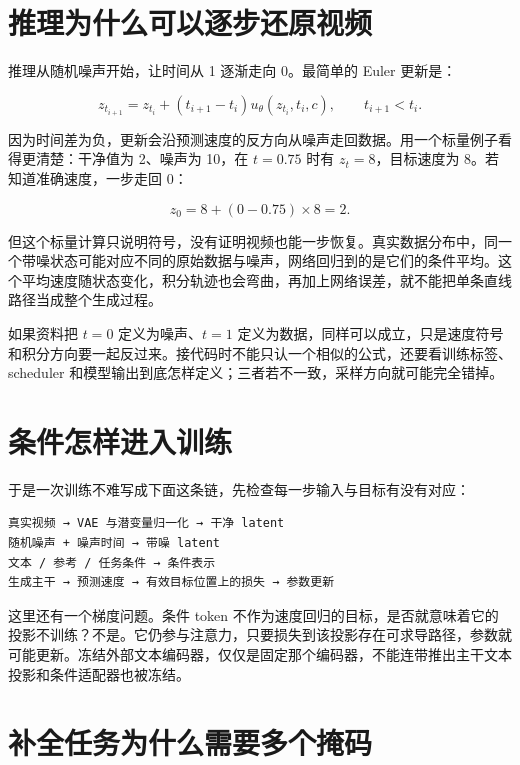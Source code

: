 \section{推理为什么可以逐步还原视频}\label{seedance-m02-ux63a8ux7406ux4e3aux4ec0ux4e48ux53efux4ee5ux9010ux6b65ux8fd8ux539fux89c6ux9891}

推理从随机噪声开始，让时间从 1 逐渐走向 0。最简单的 Euler 更新是：

\[
z_{t_{i+1}}=z_{t_i}+(t_{i+1}-t_i)u_\theta(z_{t_i},t_i,c),
\qquad t_{i+1}<t_i.
\]

因为时间差为负，更新会沿预测速度的反方向从噪声走回数据。用一个标量例子看得更清楚：干净值为 2、噪声为 10，在 \(t=0.75\) 时有 \(z_t=8\)，目标速度为 8。若知道准确速度，一步走回 0：

\[
z_0=8+(0-0.75)\times8=2.
\]

但这个标量计算只说明符号，没有证明视频也能一步恢复。真实数据分布中，同一个带噪状态可能对应不同的原始数据与噪声，网络回归到的是它们的条件平均。这个平均速度随状态变化，积分轨迹也会弯曲，再加上网络误差，就不能把单条直线路径当成整个生成过程。

如果资料把 \(t=0\) 定义为噪声、\(t=1\) 定义为数据，同样可以成立，只是速度符号和积分方向要一起反过来。接代码时不能只认一个相似的公式，还要看训练标签、scheduler 和模型输出到底怎样定义；三者若不一致，采样方向就可能完全错掉。

\section{条件怎样进入训练}\label{seedance-m02-ux6761ux4ef6ux600eux6837ux8fdbux5165ux8badux7ec3}

于是一次训练不难写成下面这条链，先检查每一步输入与目标有没有对应：

\begin{verbatim}
真实视频 → VAE 与潜变量归一化 → 干净 latent
随机噪声 + 噪声时间 → 带噪 latent
文本 / 参考 / 任务条件 → 条件表示
生成主干 → 预测速度 → 有效目标位置上的损失 → 参数更新
\end{verbatim}

这里还有一个梯度问题。条件 token 不作为速度回归的目标，是否就意味着它的投影不训练？不是。它仍参与注意力，只要损失到该投影存在可求导路径，参数就可能更新。冻结外部文本编码器，仅仅是固定那个编码器，不能连带推出主干文本投影和条件适配器也被冻结。

\section{补全任务为什么需要多个掩码}\label{seedance-m02-ux8865ux5168ux4efbux52a1ux4e3aux4ec0ux4e48ux9700ux8981ux591aux4e2aux63a9ux7801}

